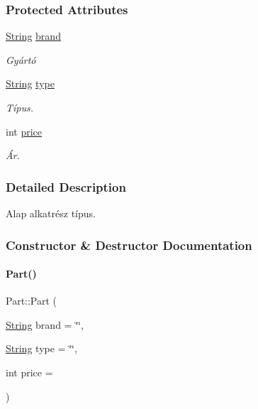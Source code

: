 \subsubsection*{Protected Attributes}
\begin{DoxyCompactItemize}
\item 
\mbox{\hyperlink{class_string}{String}} \mbox{\hyperlink{class_part_ae06f2fdeb7fbbdb229a7aca151f3e341}{brand}}
\begin{DoxyCompactList}\small\item\em Gyártó \end{DoxyCompactList}\item 
\mbox{\hyperlink{class_string}{String}} \mbox{\hyperlink{class_part_a101dbcc5c4b21564df7414c7eb0eae88}{type}}
\begin{DoxyCompactList}\small\item\em Típus. \end{DoxyCompactList}\item 
int \mbox{\hyperlink{class_part_a8e71223aed1da95a974f33d8d6c91bb1}{price}}
\begin{DoxyCompactList}\small\item\em Ár. \end{DoxyCompactList}\end{DoxyCompactItemize}


\subsubsection{Detailed Description}
Alap alkatrész típus. 

\subsubsection{Constructor \& Destructor Documentation}
\mbox{\label{class_part_aae5224ee782134c4ecb60f23ec38698f}} 
\paragraph{\texorpdfstring{Part()}{Part()}}
{\footnotesize\ttfamily Part\+::\+Part (\begin{DoxyParamCaption}\item[{\mbox{\hyperlink{class_string}{String}}}]{brand = {\ttfamily \char`\"{}\char`\"{}},  }\item[{\mbox{\hyperlink{class_string}{String}}}]{type = {\ttfamily \char`\"{}\char`\"{}},  }\item[{int}]{price = {} }\end{DoxyParamCaption})\hspace{0.3cm}{\ttfamily [inline]}}

